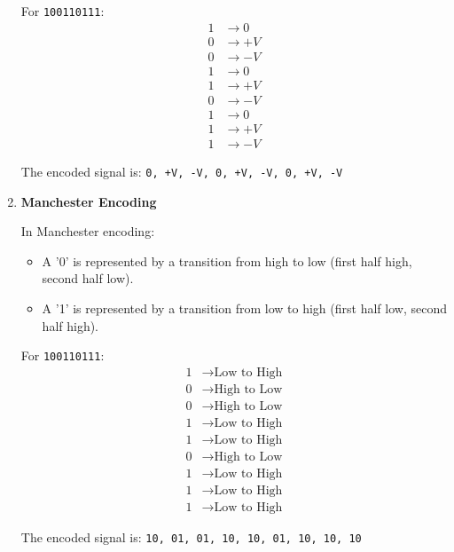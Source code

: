 \documentclass{article}
\begin{document}
\begin{enumerate}[label=\alph*.]
    For \texttt{100110111}:
    \begin{align*}
        \text{1} &\rightarrow 0 \\
        \text{0} &\rightarrow +V \\
        \text{0} &\rightarrow -V \\
        \text{1} &\rightarrow 0 \\
        \text{1} &\rightarrow +V \\
        \text{0} &\rightarrow -V \\
        \text{1} &\rightarrow 0 \\
        \text{1} &\rightarrow +V \\
        \text{1} &\rightarrow -V
    \end{align*}

    The encoded signal is: \texttt{0, +V, -V, 0, +V, -V, 0, +V, -V}

    \item \textbf{Manchester Encoding}
    
    In Manchester encoding:
    \begin{itemize}
        \item A '0' is represented by a transition from high to low (first half high, second half low).
        \item A '1' is represented by a transition from low to high (first half low, second half high).
    \end{itemize}

    For \texttt{100110111}:
    \begin{align*}
        \text{1} &\rightarrow \text{Low to High} \\
        \text{0} &\rightarrow \text{High to Low} \\
        \text{0} &\rightarrow \text{High to Low} \\
        \text{1} &\rightarrow \text{Low to High} \\
        \text{1} &\rightarrow \text{Low to High} \\
        \text{0} &\rightarrow \text{High to Low} \\
        \text{1} &\rightarrow \text{Low to High} \\
        \text{1} &\rightarrow \text{Low to High} \\
        \text{1} &\rightarrow \text{Low to High}
    \end{align*}

    The encoded signal is: \texttt{10, 01, 01, 10, 10, 01, 10, 10, 10}


\end{enumerate}
\end{document}
